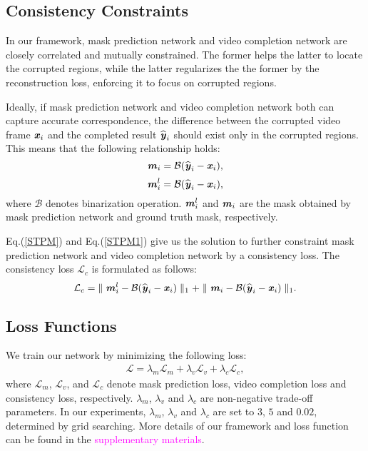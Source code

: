 \subsection{Consistency Constraints}
\label{Consistency Constraints}
In our framework, mask prediction network and video completion network are closely correlated and mutually constrained.
The former helps the latter to locate the corrupted regions, while the latter regularizes the the former by the reconstruction loss, enforcing it to focus on corrupted regions. 

Ideally, if mask prediction network and video completion network both can capture accurate correspondence, the difference between the corrupted video frame $\textbf{\emph{x}}_i$ and the completed result $\widehat{\textbf{\emph{y}}}_i$ should exist only in the corrupted regions. 
This means that the following relationship holds:
\begin{equation}
\textbf{\emph{m}}_i=\mathcal{B}(\widehat{\textbf{\emph{y}}}_i-\textbf{\emph{x}}_i),
\label{STPM}
\end{equation}
\begin{equation}
\textbf{\emph{m}}_i^l=\mathcal{B}(\widehat{\textbf{\emph{y}}}_i-\textbf{\emph{x}}_i),
\label{STPM1}
\end{equation}
where $\mathcal{B}$ denotes binarization operation. $\textbf{\emph{m}}_i^{l}$ and $\textbf{\emph{m}}_i$ are the mask obtained by mask prediction network and ground truth mask, respectively. 


Eq.(\ref{STPM}) and Eq.(\ref{STPM1}) give us the solution to further constraint mask prediction network and video completion network by a consistency loss. The consistency loss $\mathcal{{L}}_{c}$ is formulated as follows:
\begin{equation}
\mathcal{{L}}_{c}={\parallel{\textbf{\emph{m}}_i^l-\mathcal{B}(\widehat{\textbf{\emph{y}}}_i-\textbf{\emph{x}}_i)}\parallel_1+\parallel{\textbf{\emph{m}}_i-\mathcal{B}(\widehat{\textbf{\emph{y}}}_i-\textbf{\emph{x}}_i)}\parallel_1}.
\label{L-cycle_Y}
\end{equation}


\subsection{Loss Functions}
\label{Loss Functions}
We train our network by minimizing the following loss:
\begin{equation}
\begin{aligned}
\mathcal{{L}}=\lambda_{m}\mathcal{{L}}_{m}+\lambda_{v}\mathcal{{L}}_{v}+\lambda_{c}\mathcal{{L}}_{c},
\label{L-total}
\end{aligned}
\end{equation}
where $\mathcal{{L}}_{m}$, $\mathcal{{L}}_{v}$, and $\mathcal{{L}}_{c}$ denote
mask prediction loss, video completion loss and consistency loss, respectively. 
$\lambda_{m}$, $\lambda_{v}$ and $\lambda_{c}$ are non-negative trade-off parameters. 
In our experiments, 
$\lambda_{m}$, $\lambda_{v}$ and $\lambda_{c}$ are set to $3$, $5$ and $0.02$, determined by grid searching. More details of our framework and loss function can be found in the \textcolor{magenta}{supplementary materials}.

